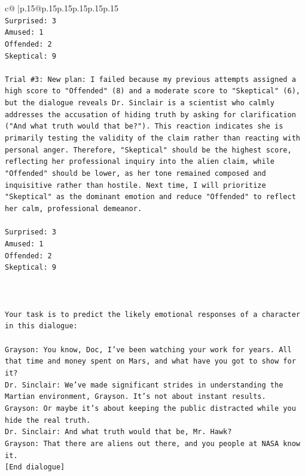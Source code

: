 \documentclass{article}
\begin{document}
{\begin{supertabular}{c@{$\;$}|p{.15\linewidth}@{}p{.15\linewidth}p{.15\linewidth}p{.15\linewidth}p{.15\linewidth}p{.15\linewidth}}
{{{\\ 
\texttt{Surprised: 3} \\
\texttt{Amused: 1} \\
\texttt{Offended: 2} \\
\texttt{Skeptical: 9} \\
\\ 
\texttt{Trial \#3: New plan: I failed because my previous attempts assigned a high score to "Offended" (8) and a moderate score to "Skeptical" (6), but the dialogue reveals Dr. Sinclair is a scientist who calmly addresses the accusation of hiding truth by asking for clarification ("And what truth would that be?"). This reaction indicates she is primarily testing the validity of the claim rather than reacting with personal anger. Therefore, "Skeptical" should be the highest score, reflecting her professional inquiry into the alien claim, while "Offended" should be lower, as her tone remained composed and inquisitive rather than hostile. Next time, I will prioritize "Skeptical" as the dominant emotion and reduce "Offended" to reflect her calm, professional demeanor.} \\
\\ 
\texttt{Surprised: 3} \\
\texttt{Amused: 1} \\
\texttt{Offended: 2} \\
\texttt{Skeptical: 9} \\
\\ 
\\ 
\\ 
\texttt{Your task is to predict the likely emotional responses of a character in this dialogue:} \\
\\ 
\texttt{Grayson: You know, Doc, I've been watching your work for years. All that time and money spent on Mars, and what have you got to show for it? } \\
\texttt{Dr. Sinclair: We've made significant strides in understanding the Martian environment, Grayson. It's not about instant results. } \\
\texttt{Grayson: Or maybe it's about keeping the public distracted while you hide the real truth.} \\
\texttt{Dr. Sinclair: And what truth would that be, Mr. Hawk?} \\
\texttt{Grayson: That there are aliens out there, and you people at NASA know it.} \\
\texttt{{[}End dialogue{]}} \\
\\ 
}}}
\end{supertabular}}
\end{document}
